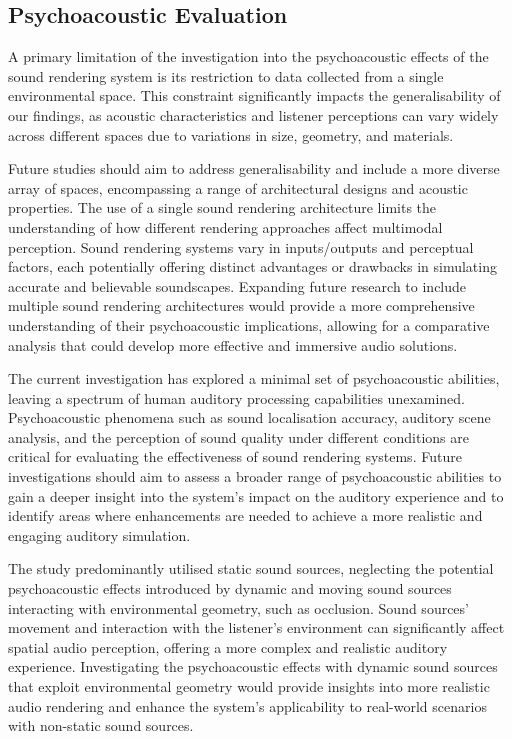 \subsection{Psychoacoustic Evaluation}
A primary limitation of the investigation into the psychoacoustic effects of the sound rendering system is its restriction to data collected from a single environmental space. This constraint significantly impacts the generalisability of our findings, as acoustic characteristics and listener perceptions can vary widely across different spaces due to variations in size, geometry, and materials.\par
Future studies should aim to address generalisability and include a more diverse array of spaces, encompassing a range of architectural designs and acoustic properties. The use of a single sound rendering architecture limits the understanding of how different rendering approaches affect multimodal perception. Sound rendering systems vary in inputs/outputs and perceptual factors, each potentially offering distinct advantages or drawbacks in simulating accurate and believable soundscapes. Expanding future research to include multiple sound rendering architectures would provide a more comprehensive understanding of their psychoacoustic implications, allowing for a comparative analysis that could develop more effective and immersive audio solutions.\par
The current investigation has explored a minimal set of psychoacoustic abilities, leaving a spectrum of human auditory processing capabilities unexamined. Psychoacoustic phenomena such as sound localisation accuracy, auditory scene analysis, and the perception of sound quality under different conditions are critical for evaluating the effectiveness of sound rendering systems. Future investigations should aim to assess a broader range of psychoacoustic abilities to gain a deeper insight into the system's impact on the auditory experience and to identify areas where enhancements are needed to achieve a more realistic and engaging auditory simulation.\par
The study predominantly utilised static sound sources, neglecting the potential psychoacoustic effects introduced by dynamic and moving sound sources interacting with environmental geometry, such as occlusion. Sound sources' movement and interaction with the listener's environment can significantly affect spatial audio perception, offering a more complex and realistic auditory experience. Investigating the psychoacoustic effects with dynamic sound sources that exploit environmental geometry would provide insights into more realistic audio rendering and enhance the system's applicability to real-world scenarios with non-static sound sources.\par

